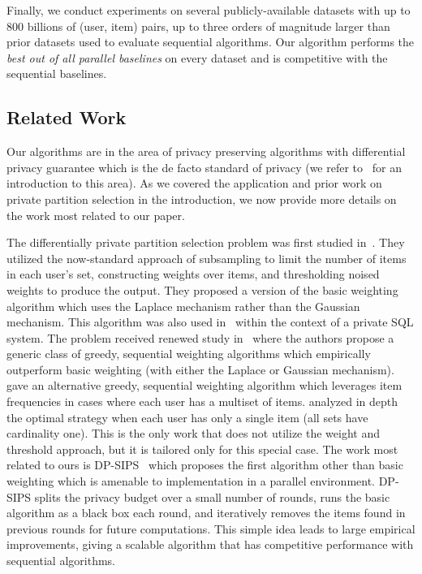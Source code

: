 Finally, we conduct experiments on several publicly-available datasets with up to 800 billions of (user, item) pairs, up to three orders of magnitude larger than prior datasets used to evaluate sequential algorithms. Our algorithm performs the \emph{best out of all parallel baselines} on every dataset and is competitive with the sequential baselines.

\subsection{Related Work}
Our algorithms are in the area of privacy preserving algorithms with differential privacy guarantee which is the de facto standard of privacy (we refer to~\cite{dwork2014book} for an introduction to this area). As we covered the application and prior work on private partition selection in the introduction, we now provide more details on the work most related to our paper.

The differentially private partition selection problem was first studied in~\cite{korolova2009releasing}. They utilized the now-standard approach of subsampling to limit the number of items in each user's set, constructing weights over items, and thresholding noised weights to produce the output. They proposed a version of the basic weighting algorithm which uses the Laplace mechanism rather than the Gaussian mechanism. This algorithm was also used in~\cite{wilson2020dpsql} within the context of a private SQL system.
The problem received renewed study in~\cite{gopi2020dpunion} where the authors propose a generic class of greedy, sequential weighting algorithms which empirically outperform basic weighting (with either the Laplace or Gaussian mechanism). \cite{carvalho2022incorporatingitem} gave an alternative greedy, sequential weighting algorithm which leverages item frequencies in cases where each user has a multiset of items.
\cite{desfontaines2022dppartition} analyzed in depth the optimal strategy when each user has only a single item (all sets have cardinality one). This is the only work that does not utilize the weight and threshold approach, but it is tailored only for this special case.
The work most related to ours is DP-SIPS~\cite{swanberg2023dpsips} which proposes the first algorithm other than basic weighting which is amenable to implementation in a parallel environment. DP-SIPS splits the privacy budget over a small number of rounds, runs the basic algorithm as a black box each round, and iteratively removes the items found in previous rounds for future computations. This simple idea leads to large empirical improvements, giving a scalable algorithm that has competitive performance with sequential algorithms.

